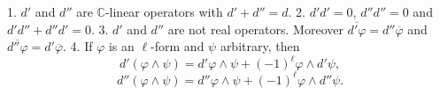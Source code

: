 1. $d'$ and $d''$ are $\mathbb{C}$-linear operators with $d' + d'' = d$.
2. $d' d' = 0$, $d'' d'' = 0$ and $d' d'' + d'' d' = 0$.
3. $d'$ and $d''$ are not real operators. Moreover $\overline{d' \varphi} = d'' \overline{\varphi}$ and $\overline{d'' \varphi} = d' \overline{\varphi}$.
4. If $\varphi$ is an $\ell$-form and $\psi$ arbitrary, then
$$d'(\varphi \wedge \psi) = d'\varphi \wedge \psi + (-1)^{\ell} \varphi \wedge d'\psi,$$
$$d''(\varphi \wedge \psi) = d''\varphi \wedge \psi + (-1)^{\ell} \varphi \wedge d''\psi.$$

